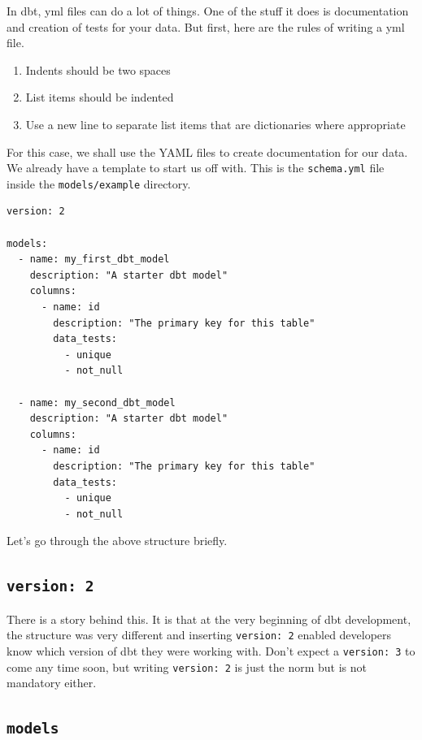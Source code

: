 \documentclass[
]{book}
\begin{document}
In dbt, yml files can do a lot of things. One of the stuff it does is documentation and creation of tests for your data. But first, here are the rules of writing a yml file.

\begin{enumerate}
\def\labelenumi{\arabic{enumi}.}
\item
  Indents should be two spaces
\item
  List items should be indented
\item
  Use a new line to separate list items that are dictionaries where appropriate
\end{enumerate}

For this case, we shall use the YAML files to create documentation for our data. We already have a template to start us off with. This is the \texttt{schema.yml} file inside the \texttt{models/example} directory.

\begin{verbatim}
version: 2

models:
  - name: my_first_dbt_model
    description: "A starter dbt model"
    columns:
      - name: id
        description: "The primary key for this table"
        data_tests:
          - unique
          - not_null

  - name: my_second_dbt_model
    description: "A starter dbt model"
    columns:
      - name: id
        description: "The primary key for this table"
        data_tests:
          - unique
          - not_null
\end{verbatim}

Let's go through the above structure briefly.

\hypertarget{version-2}{%
\subsection{\texorpdfstring{\texttt{version:\ 2}}{version: 2}}\label{version-2}}

There is a story behind this. It is that at the very beginning of dbt development, the structure was very different and inserting \texttt{version:\ 2} enabled developers know which version of dbt they were working with. Don't expect a \texttt{version:\ 3} to come any time soon, but writing \texttt{version:\ 2} is just the norm but is not mandatory either.

\hypertarget{models-2}{%
\subsection{\texorpdfstring{\texttt{models}}{models}}\label{models-2}}
\end{document}

